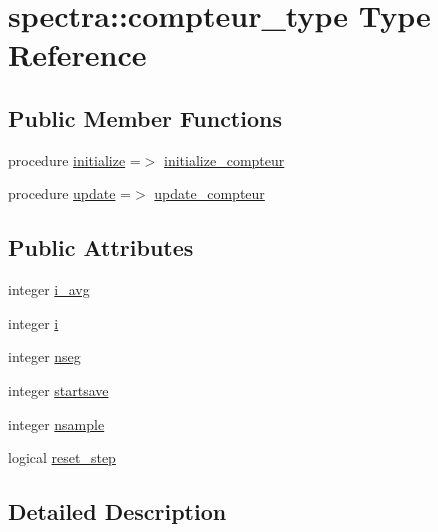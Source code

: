 \hypertarget{structspectra_1_1compteur__type}{\section{spectra\-:\-:compteur\-\_\-type Type Reference}
\label{structspectra_1_1compteur__type}
}
\subsection*{Public Member Functions}
\begin{DoxyCompactItemize}
\item 
procedure \hyperlink{structspectra_1_1compteur__type_a5432253e6f9a763ada670bd289a8847d}{initialize} =$>$ \hyperlink{classspectra_a09f515460d74e0244dfe51890780af40}{initialize\-\_\-compteur}
\item 
procedure \hyperlink{structspectra_1_1compteur__type_a62230027b2967af7f4d9480441a639e7}{update} =$>$ \hyperlink{classspectra_ac2c09ba2810302183a13063cfbf7befe}{update\-\_\-compteur}
\end{DoxyCompactItemize}
\subsection*{Public Attributes}
\begin{DoxyCompactItemize}
\item 
integer \hyperlink{structspectra_1_1compteur__type_ad4ff3ef2132c7178134ef952d6a5f373}{i\-\_\-avg}
\item 
integer \hyperlink{structspectra_1_1compteur__type_ad8d5f2fe212ac813a68e10e5d7983df4}{i}
\item 
integer \hyperlink{structspectra_1_1compteur__type_a6c0f1d4829d48d67a9ccffe6b69b93fd}{nseg}
\item 
integer \hyperlink{structspectra_1_1compteur__type_ae1d9b74d8cece740d322012af7a081fd}{startsave}
\item 
integer \hyperlink{structspectra_1_1compteur__type_a5f2a7e2a86ec1f850d5a942a07ca9e1c}{nsample}
\item 
logical \hyperlink{structspectra_1_1compteur__type_aeda7736b7039ec7881e3710582c6e448}{reset\-\_\-step}
\end{DoxyCompactItemize}


\subsection{Detailed Description}


